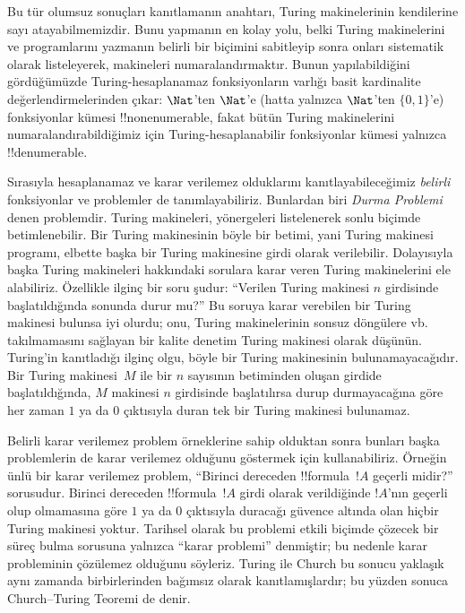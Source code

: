 Bu tür olumsuz sonuçları kanıtlamanın anahtarı, Turing makinelerinin
kendilerine sayı atayabilmemizdir. Bunu yapmanın en kolay yolu, belki Turing
makinelerini ve programlarını yazmanın belirli bir biçimini sabitleyip sonra
onları sistematik olarak listeleyerek, makineleri numaralandırmaktır. Bunun
yapılabildiğini gördüğümüzde Turing-hesaplanamaz fonksiyonların varlığı basit
kardinalite değerlendirmelerinden çıkar: $\Nat$'ten $\Nat$'e (hatta yalnızca
$\Nat$'ten $\{0,1\}$'e) fonksiyonlar kümesi !!{nonenumerable}, fakat bütün
Turing makinelerini numaralandırabildiğimiz için Turing-hesaplanabilir
fonksiyonlar kümesi yalnızca !!{denumerable}.

Sırasıyla hesaplanamaz ve karar verilemez olduklarını kanıtlayabileceğimiz
\emph{belirli} fonksiyonlar ve problemler de tanımlayabiliriz. Bunlardan biri
\emph{Durma Problemi} denen problemdir. Turing makineleri, yönergeleri
listelenerek sonlu biçimde betimlenebilir. Bir Turing makinesinin böyle bir
betimi, yani Turing makinesi programı, elbette başka bir Turing makinesine
girdi olarak verilebilir. Dolayısıyla başka Turing makineleri hakkındaki
sorulara karar veren Turing makinelerini ele alabiliriz. Özellikle ilginç bir
soru şudur: ``Verilen Turing makinesi $n$ girdisinde başlatıldığında sonunda
durur mu?'' Bu soruya karar verebilen bir Turing makinesi bulunsa iyi olurdu;
onu, Turing makinelerinin sonsuz döngülere vb. takılmamasını sağlayan bir
kalite denetim Turing makinesi olarak düşünün. Turing'in kanıtladığı ilginç
olgu, böyle bir Turing makinesinin bulunamayacağıdır. Bir Turing makinesi~$M$
ile bir $n$ sayısının betiminden oluşan girdide başlatıldığında, $M$ makinesi
$n$ girdisinde başlatılırsa durup durmayacağına göre her zaman $1$ ya da $0$
çıktısıyla duran tek bir Turing makinesi bulunamaz.

Belirli karar verilemez problem örneklerine sahip olduktan sonra bunları başka
problemlerin de karar verilemez olduğunu göstermek için kullanabiliriz.
Örneğin ünlü bir karar verilemez problem, ``Birinci dereceden
!!{formula}~$!A$ geçerli midir?'' sorusudur. Birinci dereceden
!!{formula}~$!A$ girdi olarak verildiğinde $!A$'nın geçerli olup olmamasına
göre $1$ ya da $0$ çıktısıyla duracağı güvence altında olan hiçbir Turing
makinesi yoktur. Tarihsel olarak bu problemi etkili biçimde çözecek bir süreç
bulma sorusuna yalnızca ``karar problemi'' denmiştir; bu nedenle karar
probleminin çözülemez olduğunu söyleriz. Turing ile Church bu sonucu yaklaşık
aynı zamanda birbirlerinden bağımsız olarak kanıtlamışlardır; bu yüzden sonuca
Church--Turing Teoremi de denir.

